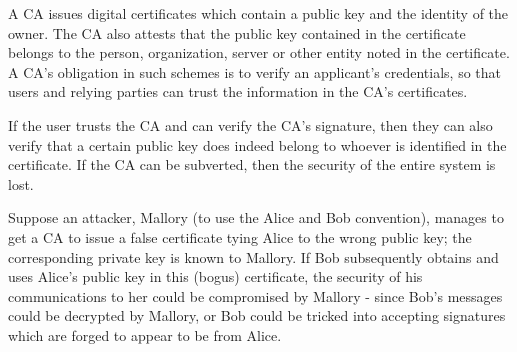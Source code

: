 A CA issues digital certificates which contain a public key and the identity of the owner. The CA also attests that the public key contained in the certificate belongs to the person, organization, server or other entity noted in the certificate. A CA's obligation in such schemes is to verify an applicant's credentials, so that users and relying parties can trust the information in the CA's certificates.

If the user trusts the CA and can verify the CA's signature, then they can also verify that a certain public key does indeed belong to whoever is identified in the certificate. If the CA can be subverted, then the security of the entire system is lost.

Suppose an attacker, Mallory (to use the Alice and Bob convention), manages to get a CA to issue a false certificate tying Alice to the wrong public key; the corresponding private key is known to Mallory. If Bob subsequently obtains and uses Alice's public key in this (bogus) certificate, the security of his communications to her could be compromised by Mallory - since Bob's messages could be decrypted by Mallory, or Bob could be tricked into accepting signatures which are forged to appear to be from Alice.

